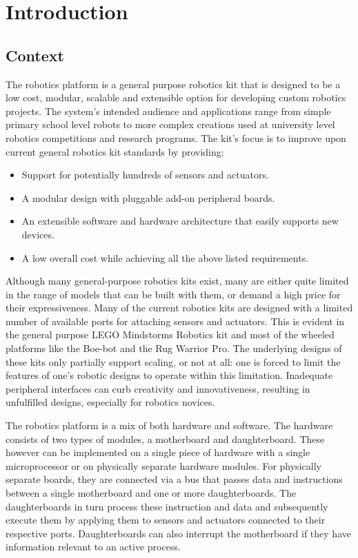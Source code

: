 \chapter{Introduction} 

\section{Context}
The \xten robotics platform is a general purpose robotics kit that is designed to be a low cost, modular, scalable and extensible option for developing custom robotics projects. The system's intended audience and applications range from simple primary school level robots to more complex creations used at university level robotics competitions and research programs. The \xten kit's focus is to improve upon current general robotics kit standards by providing:
\begin{itemize}
\item Support for potentially hundreds of sensors and actuators.
\item A modular design with pluggable add-on peripheral boards.
\item An extensible software and hardware architecture that easily supports new devices.
\item A low overall cost while achieving all the above listed requirements.
\end{itemize}

Although many general-purpose robotics kits exist, many are either quite limited in the range of models that can be built with them, or demand a high price for their expressiveness. Many of the current robotics kits are designed with a limited number of available ports for attaching sensors and actuators. This is evident in the general purpose LEGO Mindstorms Robotics kit and most of the wheeled platforms like the Boe-bot and the Rug Warrior Pro. %
The underlying designs of these kits only partially support scaling, or not at all: one is forced to limit the features of one's robotic designs to operate within this limitation. Inadequate peripheral interfaces can curb creativity and innovativeness, resulting in unfulfilled designs, especially for robotics novices.

The \xten robotics platform is a mix of both hardware and software. The hardware consists of two types of modules, a motherboard and daughterboard. These however can be implemented on a single piece of hardware with a single microprocessor or on physically separate hardware modules. For physically separate boards, they are connected via a bus that passes data and instructions between a single motherboard and one or more daughterboards. The daughterboards in turn process these instruction and data and subsequently execute them by applying them to sensors and actuators connected to their respective ports. Daughterboards can also interrupt the motherboard if they have information relevant to an active process.


